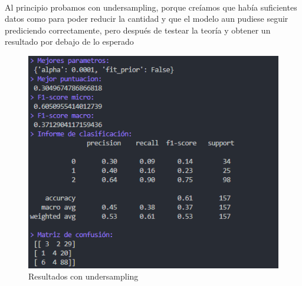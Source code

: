 \documentclass{report}
\begin{document}
{{                \paragraph*{}
                {
                    Al principio probamos con undersampling, porque creíamos que había suficientes datos como para poder reducir la cantidad y que el modelo aun pudiese seguir prediciendo correctamente, pero después de testear la teoría y obtener un resultado por debajo de lo esperado \color{red}{Peor puntacion:}
                }
                \begin{figure}[H]
                    \centering
                    \includegraphics[width=\textwidth]{img/undersampling.png}
                    \caption{Resultados con undersampling}
                \end{figure}
}}
\end{document}
